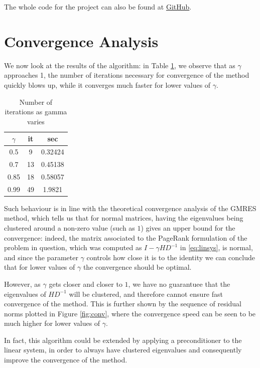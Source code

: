 \documentclass[a4paper]{article}
\theoremstyle{definition}
\theoremstyle{definition}
\theoremstyle{remark}
\theoremstyle{definition}
\begin{document}
The whole code for the project can also be found at \href{https://github.com/BachoSeven/progettoCS}{GitHub}.
\section{Convergence Analysis}
We now look at the results of the algorithm: in Table \ref{tab:convergenza}, we observe that as $\gamma$ approaches 1, the number of iterations necessary for convergence of the
method quickly blows up, while it converges much faster for lower values of $\gamma$.

\begin{table}[htpb]
	\centering
	\label{tab:convergenza}
	\begin{tabular}{ccc}
		\toprule
		$\gamma$ & it & sec\\
		\midrule
		0.5 & 9 & 0.32424\\
		0.7 & 13 & 0.45138\\
		0.85 & 18 & 0.58057\\
		0.99 & 49 & 1.9821\\
		\bottomrule
	\end{tabular}
	\caption{Number of iterations as gamma varies}
\end{table}

Such behaviour is in line with the theoretical convergence analysis of the GMRES method, which tells us that for normal matrices, having the eigenvalues being clustered around a
non-zero value (such as $1$) gives an upper bound for the convergence: indeed, the matrix associated to the
PageRank formulation of the problem in question, which was computed as $I-\gamma HD^{-1}$ in \eqref{eq:linsys}, is normal, and since the parameter $\gamma$ controls how close it
is to the identity we can conclude that for lower values of $\gamma$ the convergence should be optimal.

However, as $\gamma$ gets closer and closer to $1$, we have no guarantuee that the eigenvalues of  $HD^{-1}$ will be clustered, and therefore cannot ensure fast convergence of the
method. This is further shown by the sequence of residual norms plotted in Figure \ref{fig:conv}, where the convergence speed can be seen to be much higher for lower values of $\gamma$.

In fact, this algorithm could be extended by applying a preconditioner to the linear system, in order to always have clustered eigenvalues and consequently improve the convergence of
the method.
\end{document}
